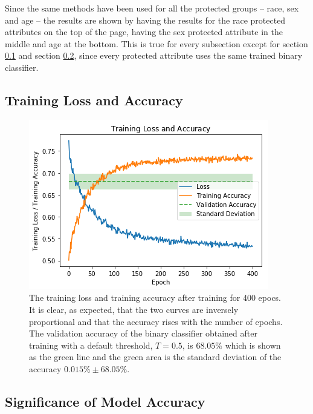 \documentclass[11pt, fleqn, titlepage]{article}
\begin{document}
	Since the same methods have been used for all the protected groups -- race, sex and age -- the results are shown by having the results for the race protected attributes on the top of the page, having the sex protected attribute in the middle and age at the bottom. This is true for every subsection except for section \ref{training_loss_and_accuracy} and section \ref{modelAccuracy}, since every protected attribute uses the same trained binary classifier.
	
	\subsection{Training Loss and Accuracy}\label{training_loss_and_accuracy}
	
	\begin{figure}[H]
			\centering
			\includegraphics[width=0.5\linewidth]{imgs/loss_curve.png}
		\caption{The training loss and training accuracy after training for 400 epocs. It is clear, as expected, that the two curves are inversely proportional and that the accuracy rises with the number of epochs.  The validation accuracy of the binary classifier obtained after training with a default threshold, $ T=0.5 $, is $ 68.05\%$ which is shown as the green line and the green area is the standard deviation of the accuracy $0.015\% \pm 68.05\%$.%
		}
		\label{fig:losscurve}
	\end{figure}
	
	\subsection{Significance of Model Accuracy}\label{modelAccuracy}
	
\end{document}
